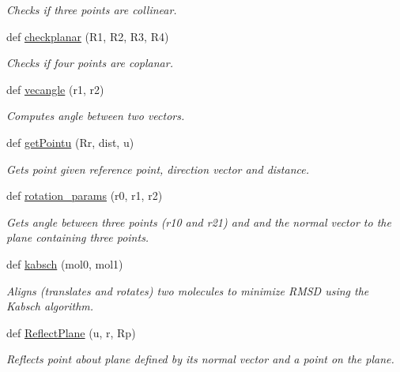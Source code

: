 \begin{DoxyCompactItemize}
\begin{DoxyCompactList}\small\item\em Checks if three points are collinear. \end{DoxyCompactList}\item 
def \hyperlink{namespacemolSimplify_1_1Scripts_1_1geometry_ac2cd923a9da794af670abf98d5ca91e1}{checkplanar} (R1, R2, R3, R4)
\begin{DoxyCompactList}\small\item\em Checks if four points are coplanar. \end{DoxyCompactList}\item 
def \hyperlink{namespacemolSimplify_1_1Scripts_1_1geometry_ab85ace2116d6845043cd6658e191bb66}{vecangle} (r1, r2)
\begin{DoxyCompactList}\small\item\em Computes angle between two vectors. \end{DoxyCompactList}\item 
def \hyperlink{namespacemolSimplify_1_1Scripts_1_1geometry_a5bfdcb82216f2f334bdf30542cd168bf}{get\+Pointu} (Rr, dist, u)
\begin{DoxyCompactList}\small\item\em Gets point given reference point, direction vector and distance. \end{DoxyCompactList}\item 
def \hyperlink{namespacemolSimplify_1_1Scripts_1_1geometry_a3571c84ff85925ce0a23c08efddf5e1a}{rotation\+\_\+params} (r0, r1, r2)
\begin{DoxyCompactList}\small\item\em Gets angle between three points (r10 and r21) and and the normal vector to the plane containing three points. \end{DoxyCompactList}\item 
def \hyperlink{namespacemolSimplify_1_1Scripts_1_1geometry_ab71755d5aac3ee68201fb79536be659d}{kabsch} (mol0, mol1)
\begin{DoxyCompactList}\small\item\em Aligns (translates and rotates) two molecules to minimize R\+M\+SD using the Kabsch algorithm. \end{DoxyCompactList}\item 
def \hyperlink{namespacemolSimplify_1_1Scripts_1_1geometry_a9a8fcceacae8daff63411a8fc15a9f25}{Reflect\+Plane} (u, r, Rp)
\begin{DoxyCompactList}\small\item\em Reflects point about plane defined by its normal vector and a point on the plane. \end{DoxyCompactList}\item 

\end{DoxyCompactItemize}
